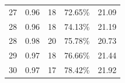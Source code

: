 \documentclass[12pt]{article}
\begin{document}
\begin{table}[htbp]
\begin{tabular}{lrrrr}
    27                    & 0.96                & 18                    & 72.65\%                     & 21.09                           \\
    28                    & 0.96                & 18                    & 74.13\%                     & 21.19                           \\
    28                    & 0.98                & 20                    & 75.78\%                     & 20.73                           \\
    29                    & 0.97                & 18                    & 76.66\%                     & 21.44                           \\
    30                    & 0.97                & 17                    & 78.42\%                     & 21.92                           \\
    \bottomrule
  \end{tabular}
\end{table}
\end{document}
